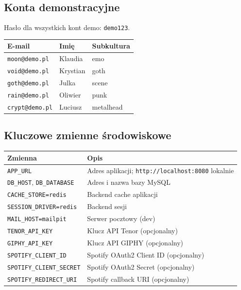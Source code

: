 \documentclass[12pt,a4paper]{article}
\begin{document}
\subsection{Konta demonstracyjne}

Hasło dla wszystkich kont demo: \texttt{demo123}.

\begin{center}
\begin{tabular}{lll}
\toprule
\textbf{E-mail} & \textbf{Imię} & \textbf{Subkultura} \\
\midrule
\texttt{moon@demo.pl} & Klaudia & emo \\
\texttt{void@demo.pl} & Krystian & goth \\
\texttt{goth@demo.pl} & Julka & scene \\
\texttt{rain@demo.pl} & Oliwier & punk \\
\texttt{crypt@demo.pl} & Luciusz & metalhead \\
\bottomrule
\end{tabular}
\end{center}

\subsection{Kluczowe zmienne środowiskowe}

\begin{longtable}{|p{5.5cm}|p{7.7cm}|}
\hline
\textbf{Zmienna} & \textbf{Opis} \\
\hline
\texttt{APP\_URL} & Adres aplikacji; \texttt{http://localhost:8080} lokalnie \\
\hline
\texttt{DB\_HOST}, \texttt{DB\_DATABASE} & Adres i nazwa bazy MySQL \\
\hline
\texttt{CACHE\_STORE=redis} & Backend cache aplikacji \\
\hline
\texttt{SESSION\_DRIVER=redis} & Backend sesji \\
\hline
\texttt{MAIL\_HOST=mailpit} & Serwer pocztowy (dev) \\
\hline
\texttt{TENOR\_API\_KEY} & Klucz API Tenor (opcjonalny) \\
\hline
\texttt{GIPHY\_API\_KEY} & Klucz API GIPHY (opcjonalny) \\
\hline
\texttt{SPOTIFY\_CLIENT\_ID} & Spotify OAuth2 Client ID (opcjonalny) \\
\hline
\texttt{SPOTIFY\_CLIENT\_SECRET} & Spotify OAuth2 Secret (opcjonalny) \\
\hline
\texttt{SPOTIFY\_REDIRECT\_URI} & Spotify callback URI (opcjonalny) \\
\hline
\end{longtable}
\end{document}
